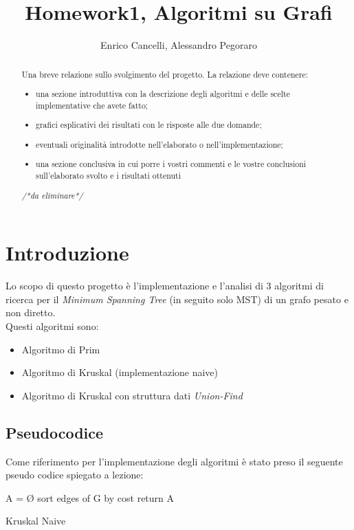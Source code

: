 \documentclass[]{article}
\title{Homework1, Algoritmi su Grafi}
\author{Enrico Cancelli, Alessandro Pegoraro}
\begin{document}
\maketitle

\begin{abstract}
	Una breve relazione sullo svolgimento del progetto. La relazione deve contenere:
	\begin{itemize}
		\item una sezione introduttiva con la descrizione degli algoritmi e delle scelte implementative che avete fatto;
		\item grafici esplicativi dei risultati con le risposte alle due domande;
		\item eventuali originalità introdotte nell'elaborato o nell'implementazione;
		\item una sezione conclusiva in cui porre i vostri commenti e le vostre conclusioni sull'elaborato svolto e i risultati ottenuti
	\end{itemize}
	\textit{/*da eliminare*/}
\end{abstract}

\section{Introduzione}
Lo scopo di questo progetto è l'implementazione e l'analisi di 3 algoritmi di ricerca per il \textit{Minimum Spanning Tree} (in seguito solo MST) di un grafo pesato e non diretto.\\
Questi algoritmi sono:
\begin{itemize}
	\item Algoritmo di Prim
	\item Algoritmo di Kruskal (implementazione naive)
	\item Algoritmo di Kruskal con struttura dati \textit{Union-Find}
\end{itemize}
\subsection{Pseudocodice}
Come riferimento per l'implementazione degli algoritmi è stato preso il seguente pseudo codice spiegato a lezione:\\
\begin{algorithm}[H]
	\SetAlgoLined
	\DontPrintSemicolon
	A = Ø\;
	sort edges of G by cost\;
	return A\;
	\caption{Kruskal Naive}
\end{algorithm}
\end{document}
